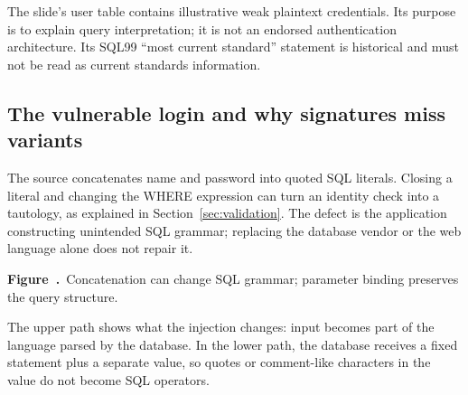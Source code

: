 \documentclass[11pt,a4paper]{article}
\numberwithin{figure}{section}
\newcommand{\diagramcaption}[1]{\par\smallskip\refstepcounter{figure}\begin{center}\small\textbf{Figure~\thefigure.}~#1\end{center}}
\begin{document}
The slide's user table contains illustrative weak plaintext credentials. Its purpose is to explain query interpretation; it is not an endorsed authentication architecture. Its SQL99 ``most current standard'' statement is historical and must not be read as current standards information.

\subsection{The vulnerable login and why signatures miss variants}
The source concatenates name and password into quoted SQL literals. Closing a literal and changing the WHERE expression can turn an identity check into a tautology, as explained in Section~\ref{sec:validation}. The defect is the application constructing unintended SQL grammar; replacing the database vendor or the web language alone does not repair it.

\begin{center}\end{center}
\diagramcaption{Concatenation can change SQL grammar; parameter binding preserves the query structure.}
The upper path shows what the injection changes: input becomes part of the language parsed by the database. In the lower path, the database receives a fixed statement plus a separate value, so quotes or comment-like characters in the value do not become SQL operators.
\end{document}
